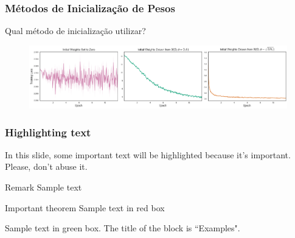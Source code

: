 \documentclass{beamer}
\begin{document}
\begin{frame}
	\frametitle{Métodos de Inicialização de Pesos}
	\begin{block}{Qual método de inicialização utilizar?}
	\begin{figure}
		\centering
		\includegraphics[width=0.5\linewidth]{figures/weights_init}
	\end{figure}
	\end{block}
\end{frame}



\begin{frame}
	
\frametitle{Highlighting text}
%
In this slide, some important text will be
\alert{highlighted} because it's important.
Please, don't abuse it.

\begin{block}{Remark}
Sample text
\end{block}

\begin{alertblock}{Important theorem}
Sample text in red box
\end{alertblock}

\begin{examples}
Sample text in green box. The title of the block is ``Examples".
\end{examples}
\end{frame}
\end{document}
